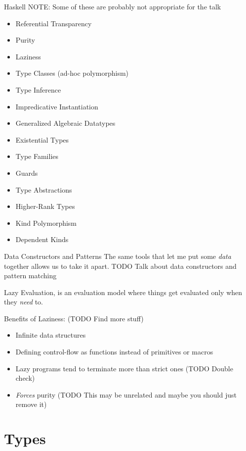 \documentclass[pdf]{beamer}
\begin{document}
\begin{frame}{Haskell}
  NOTE: Some of these are probably not appropriate for the talk
  \begin{itemize}
  \item Referential Transparency
  \item Purity
  \item Laziness
  \item Type Classes (ad-hoc polymorphism)
  \item Type Inference
  \item Impredicative Instantiation
  \item Generalized Algebraic Datatypes
  \item Existential Types
  \item Type Families
  \item Guards
  \item Type Abstractions
  \item Higher-Rank Types
  \item Kind Polymorphism
  \item Dependent Kinds
  \end{itemize}

\end{frame}

\begin{frame}{Data Constructors and Patterns}
  The same tools that let me put some \textit{data} together allows us to take it apart.
  TODO Talk about data constructors and pattern matching
\end{frame}

\begin{frame}
  Lazy Evaluation, is an evaluation model where things get evaluated only when they \textit{need} to.

  Benefits of Laziness: (TODO Find more stuff)
  \begin{itemize}
  \item Infinite data structures
  \item Defining control-flow as functions instead of primitives or macros
  \item Lazy programs tend to terminate more than strict ones (TODO Double check)
  \item \textit{Forces} purity (TODO This may be unrelated and maybe you should just remove it)
  \end{itemize}
\end{frame}

\section{Types}
\label{sec:types}
\end{document}

